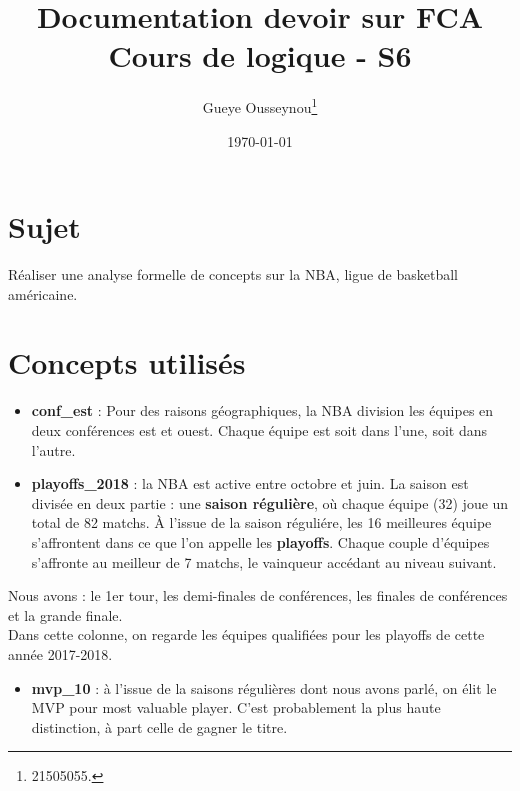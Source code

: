 \documentclass[a4paper,11pt]{article}
\author{Gueye Ousseynou\thanks{21505055.}}
\date{\today}
\title{\textbf{Documentation devoir sur FCA} \\ Cours de logique - S6}
\begin{document}
\maketitle
\setcounter{tocdepth}{3}
\tableofcontents

\section{Sujet}
\label{sec-1}

Réaliser une analyse formelle de concepts sur la NBA, ligue de basketball américaine. \\

\section{Concepts utilisés}
\label{sec-2}

\begin{itemize}
\item \textbf{conf\_est} : Pour des raisons géographiques, la NBA division les équipes en deux conférences est et ouest. Chaque équipe est soit dans l'une, soit dans l'autre. \\

\item \textbf{playoffs\_2018} : la NBA est active entre octobre et juin. La saison est divisée en deux partie : une \textbf{saison régulière}, où chaque équipe (32) joue un total de 82 matchs. À l'issue de la saison réguliére, les 16 meilleures équipe s'affrontent dans ce que l'on appelle les \textbf{playoffs}. Chaque couple d'équipes s'affronte au meilleur de 7 matchs, le vainqueur accédant au niveau suivant. \\
\end{itemize}

Nous avons : le 1er tour, les demi-finales de conférences, les finales de conférences et la grande finale. \\

Dans cette colonne, on regarde les équipes qualifiées pour les playoffs de cette année 2017-2018. \\

\begin{itemize}
\item \textbf{mvp\_10} : à l'issue de la saisons régulières dont nous avons parlé, on élit le MVP pour most valuable player. C'est probablement la plus haute distinction, à part celle de gagner le titre. \\
\end{itemize}
\end{document}
